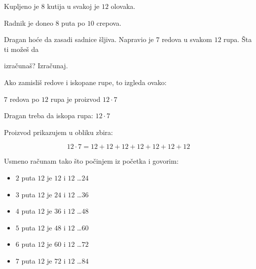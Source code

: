     \begin{zad}

        Kupljeno je $8$ kutija u svakoj je $12$ olovaka.

    \end{zad}

    \begin{zad}

        Radnik je doneo $8$ puta po $10$ crepova.

    \end{zad}

    \begin{zad}

        Dragan ho\' ce da zasadi sadnice \v sljiva. Napravio je $7$ redova u svakom $12$ rupa. \v Sta ti mo\v ze\v s da

        izra\v cuna\v s? Izra\v cunaj.

    \end{zad}



    Ako zamisli\v s redove i iskopane rupe, to izgleda ovako:

    \begin{figure}


    \end{figure}

    $7$ redova po $12$ rupa je proizvod $12 \cdot 7$



    Dragan treba da iskopa rupa: $12 \cdot 7$

    Proizvod prikazujem u obliku zbira:



    $$12 \cdot 7 = 12 + 12 + 12 + 12 + 12 + 12 + 12$$



    Usmeno ra\v cunam tako \v sto po\v cinjem iz po\v cetka i govorim:

    \begin{itemize}

        \item $2$ puta $12$ je $12$ i $12$ \dots $24$

        \item $3$ puta $12$ je $24$ i $12$ \dots $36$

        \item $4$ puta $12$ je $36$ i $12$ \dots $48$

        \item $5$ puta $12$ je $48$ i $12$ \dots $60$

        \item $6$ puta $12$ je $60$ i $12$ \dots $72$

        \item $7$ puta $12$ je $72$ i $12$ \dots $84$

    \end{itemize}



